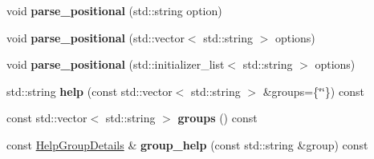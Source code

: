\begin{DoxyCompactItemize}
\item 
void {\bfseries parse\+\_\+positional} (std\+::string option)\hypertarget{classcxxopts_1_1Options_a08d69938b38f43d9bc534ec3b60e672b}{}\label{classcxxopts_1_1Options_a08d69938b38f43d9bc534ec3b60e672b}

\item 
void {\bfseries parse\+\_\+positional} (std\+::vector$<$ std\+::string $>$ options)\hypertarget{classcxxopts_1_1Options_a9078209209185ac59cb6b293558919da}{}\label{classcxxopts_1_1Options_a9078209209185ac59cb6b293558919da}

\item 
void {\bfseries parse\+\_\+positional} (std\+::initializer\+\_\+list$<$ std\+::string $>$ options)\hypertarget{classcxxopts_1_1Options_a21ddde716cb71a6ba1b7943e313a3398}{}\label{classcxxopts_1_1Options_a21ddde716cb71a6ba1b7943e313a3398}

\item 
std\+::string {\bfseries help} (const std\+::vector$<$ std\+::string $>$ \&groups=\{\char`\"{}\char`\"{}\}) const \hypertarget{classcxxopts_1_1Options_ad03feeae7c582ae78fab4117a9702732}{}\label{classcxxopts_1_1Options_ad03feeae7c582ae78fab4117a9702732}

\item 
const std\+::vector$<$ std\+::string $>$ {\bfseries groups} () const \hypertarget{classcxxopts_1_1Options_a8c2c62a988de2f6afc95da64d910984d}{}\label{classcxxopts_1_1Options_a8c2c62a988de2f6afc95da64d910984d}

\item 
const \hyperlink{structcxxopts_1_1HelpGroupDetails}{Help\+Group\+Details} \& {\bfseries group\+\_\+help} (const std\+::string \&group) const \hypertarget{classcxxopts_1_1Options_a5750a0ed65f7e8f1c18b996f663b68b9}{}\label{classcxxopts_1_1Options_a5750a0ed65f7e8f1c18b996f663b68b9}

\end{DoxyCompactItemize}
